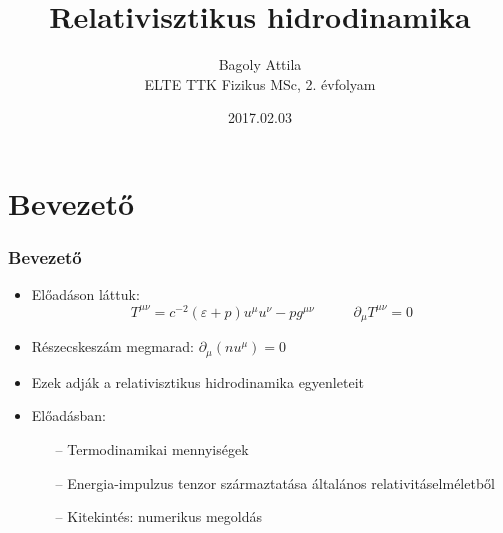 \documentclass{beamer}
\title[Relativisztikus hidrodinamika]{Relativisztikus hidrodinamika}
\author[Bagoly Attila]{Bagoly Attila\\ ELTE TTK Fizikus MSc, 2. évfolyam \vspace{0.5cm}}
\date[2017.02.03]{2017.02.03}
\institute[ELTE]{
\large{Relativisztikus atommag-ütközések}

}
\begin{document}
\begin{frame}
  \titlepage
\end{frame}




\section{Bevezető}
\begin{frame}
\frametitle{Bevezető}
\begin{itemize}
  \setlength{\itemsep}{15pt}
\item Előadáson láttuk: 
\begin{equation}
T^{\mu\nu}=c^{-2}(\varepsilon+p)u^\mu u^\nu -p g^{\mu\nu}\;\;\;\;\;\;\;\;\;\; \partial_\mu T^{\mu\nu}=0
\end{equation}
\item Részecskeszám megmarad: $\partial_\mu(n u^\mu)=0$

\item Ezek adják a relativisztikus hidrodinamika egyenleteit

\item Előadásban:
 \begin{itemize}
   \setlength{\itemsep}{10pt}
 	\item[--] Termodinamikai mennyiségek
 	\item[--] Energia-impulzus tenzor származtatása általános relativitáselméletből
 	\item[--] Kitekintés: numerikus megoldás
 \end{itemize}

\end{itemize}
\end{frame}

 
\end{document}
